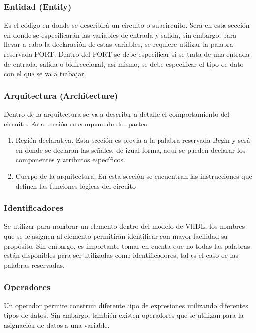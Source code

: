 \documentclass{article}
\begin{document}
\subsubsection{Entidad (Entity)}
Es el código en donde se describirá un circuito o subcircuito. Será en esta sección en donde se especificarán las variables de entrada y salida, sin embargo, para llevar a cabo la declaración de estas variables, se requiere utilizar la palabra reservada PORT. Dentro del PORT se debe especificar si se trata de una entrada de entrada, salida o bidireccional, así mismo, se debe especificar el tipo de dato con el que se va a trabajar.
\subsubsection{Arquitectura (Architecture)}
Dentro de la arquitectura se va a describir a detalle el comportamiento del circuito. Esta sección se compone de dos partes
\begin{enumerate}
    \item Región declarativa. Esta sección es previa a la palabra reservada Begin y será en donde se declaran las señales, de igual forma, aquí se pueden declarar los componentes y atributos específicos.
    \item Cuerpo de la arquitectura. En esta sección se encuentran las instrucciones que definen las funciones lógicas del circuito
\end{enumerate}

\subsubsection{Identificadores}
Se utilizar para nombrar un elemento dentro del modelo de VHDL, los nombres que se le asignen al elemento permitirán identificar con mayor facilidad su propósito. Sin embargo, es importante tomar en cuenta que no todas las palabras están disponibles para ser utilizadas como identificadores, tal es el caso de las palabras reservadas. 
\subsubsection{Operadores}
Un operador permite construir diferente tipo de expresiones utilizando diferentes tipos de datos. Sin embargo, también existen operadores que se utilizan para la asignación de datos a una variable.
\end{document}
